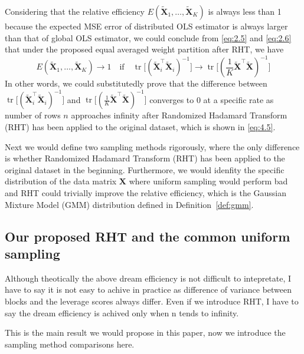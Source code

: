 \documentclass[11pt]{article}
\numberwithin{equation}{section}
\theoremstyle{plain}
\theoremstyle{definition}
\theoremstyle{remark}
\begin{document}
Considering that the relative efficiency \(E(\mathbf{\tilde{X}}_1,\ldots,\mathbf{\tilde{X}}_K)\) is always less than 1 because the expected MSE error of distributed OLS estimator is always larger than that of global OLS estimator, we could conclude from \ref{eq:2.5} and \ref{eq:2.6} that under the proposed equal averaged weight partition after RHT, we have
\[
E(\mathbf{\tilde{X}}_1,\ldots,\mathbf{\tilde{X}}_K) \to 1 \quad \text{if} \quad \operatorname{tr}\!\bigl[(\mathbf{\tilde{X}}_i^{\top}\mathbf{\tilde{X}}_i)^{-1}\bigr] \to \operatorname{tr}\!\bigl[(\frac{1}{K}\mathbf{\tilde{X}}^{\top}\mathbf{\tilde{X}})^{-1}\bigr]\tag{2.6} \label{eq:2.6}
\]
In other words, we could substitutedly prove that the difference between \(\operatorname{tr}\!\bigl[(\mathbf{\tilde{X}}_i^{\top}\mathbf{\tilde{X}}_i)^{-1}\bigr]\) and \(\operatorname{tr}\!\bigl[(\frac{1}{K}\mathbf{\tilde{X}}^{\top}\mathbf{\tilde{X}})^{-1}\bigr]\) converges to 0 at a specific rate as number of rows \(n\) approaches infinity after Randomized Hadamard Transform (RHT) has been applied to the original dataset, which is shown in \ref{eq:4.5}.

Next we would define two sampling methods rigorously, where the only difference is whether Randomized Hadamard Transform (RHT) has been applied to the original dataset in the beginning. Furthermore, we would idenfity the specific distribution of the data matrix $\mathbf{X}$ where uniform sampling would perform bad and RHT could trivially improve the relative efficiency, which is the Gaussian Mixture Model (GMM) distribution defined in Definition~\ref{def:gmm}.

\subsection{Our proposed RHT and the common uniform sampling}

Although theotically the above dream efficiency is not difficult to intepretate, I have to say it is not easy to achive in practice as difference of variance between blocks and the leverage scores always differ.
Even if we introduce RHT, I have to say the dream efficiency is achived only when n tends to infinity.

This is the main result we would propose in this paper, now we introduce the sampling method comparisons here.
\end{document}
